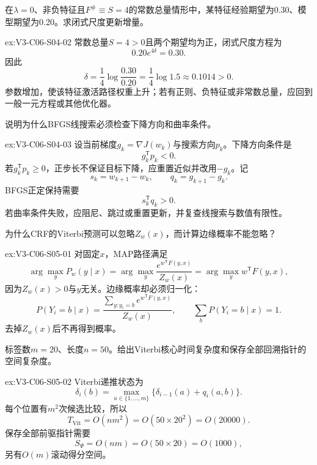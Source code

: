 \begin{SLChapterExercisePairSection}
\begin{exercise}\label{ex:V3-C06-S04-02}
在$\lambda=0$、非负特征且$F^{\#}\equiv S=4$的常数总量情形中，某特征经验期望为0.30、模型期望为0.20。求闭式尺度更新增量。
\end{exercise}
\ifSLFullEdition
{}\label{sol:V3-C06-S04-02}
\begin{chapterexercisesolution}{ex:V3-C06-S04-02}
常数总量$S=4>0$且两个期望均为正，闭式尺度方程为
\[
0.20e^{4\delta}=0.30.
\]
因此
\[
\delta=\frac14\log\frac{0.30}{0.20}
=\frac14\log1.5\approx0.1014>0.
\]
参数增加，使该特征激活路径权重上升；若有正则、负特征或非常数总量，应回到一般一元方程或其他优化器。
\end{chapterexercisesolution}
\fi

\begin{exercise}\label{ex:V3-C06-S04-03}
说明为什么BFGS线搜索必须检查下降方向和曲率条件。
\end{exercise}
\ifSLFullEdition
{}\label{sol:V3-C06-S04-03}
\begin{chapterexercisesolution}{ex:V3-C06-S04-03}
设当前梯度$g_k=\nabla J(w_k)$与搜索方向$p_k$。下降方向条件是
\[
g_k^{\mathsf T}p_k<0.
\]
若$g_k^{\mathsf T}p_k\geq0$，正步长不保证目标下降，应重置近似并改用$-g_k$。记
\[
s_k=w_{k+1}-w_k,
\qquad
q_k=g_{k+1}-g_k.
\]
BFGS正定保持需要
\[
s_k^{\mathsf T}q_k>0.
\]
若曲率条件失败，应阻尼、跳过或重置更新，并复查线搜索与数值有限性。
\end{chapterexercisesolution}
\fi

\begin{exercise}\label{ex:V3-C06-S05-01}
为什么CRF的Viterbi预测可以忽略$Z_w(x)$，而计算边缘概率不能忽略？
\end{exercise}
\ifSLFullEdition
{}\label{sol:V3-C06-S05-01}
\begin{chapterexercisesolution}{ex:V3-C06-S05-01}
对固定$x$，MAP路径满足
\[
\arg\max_yP_w(y\mid x)
=\arg\max_y\frac{e^{w^{\mathsf T}F(y,x)}}{Z_w(x)}
=\arg\max_y w^{\mathsf T}F(y,x),
\]
因为$Z_w(x)>0$与$y$无关。边缘概率却必须归一化：
\[
P(Y_i=b\mid x)
=\frac{\sum_{y:y_i=b}e^{w^{\mathsf T}F(y,x)}}{Z_w(x)},
\qquad
\sum_bP(Y_i=b\mid x)=1.
\]
去掉$Z_w(x)$后不再得到概率。
\end{chapterexercisesolution}
\fi

\begin{exercise}\label{ex:V3-C06-S05-02}
标签数$m=20$、长度$n=50$。给出Viterbi核心时间复杂度和保存全部回溯指针的空间复杂度。
\end{exercise}
\ifSLFullEdition
{}\label{sol:V3-C06-S05-02}
\begin{chapterexercisesolution}{ex:V3-C06-S05-02}
Viterbi递推状态为
\[
\delta_i(b)=\max_{a\in\{1,\ldots,m\}}
\{\delta_{i-1}(a)+q_i(a,b)\}.
\]
每个位置有$m^2$次候选比较，所以
\[
T_{\mathrm{Vit}}=O(nm^2)=O(50\times20^2)=O(20000).
\]
保存全部前驱指针需要
\[
S_{\Psi}=O(nm)=O(50\times20)=O(1000),
\]
另有$O(m)$滚动得分空间。
\end{chapterexercisesolution}
\fi


\end{SLChapterExercisePairSection}
